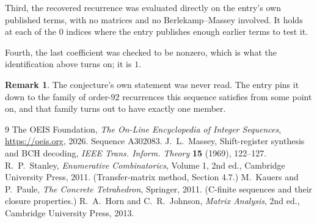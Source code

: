 \documentclass[11pt,a4paper]{article}
\theoremstyle{plain}
\theoremstyle{definition}
\newtheorem{remark}[theorem]{Remark}
\begin{document}
Third, the recovered recurrence was evaluated directly on the entry's own published terms, with
no matrices and no Berlekamp--Massey involved. It holds at each of the $0$ indices where
the entry publishes enough earlier terms to test it.

Fourth, the last coefficient was checked to be nonzero, which is what the identification above
turns on; it is $1$.

\begin{remark}
The conjecture's own statement was never read. The entry pins it down to the family of
order-$92$ recurrences this sequence satisfies from some point on, and that family turns
out to have exactly one member.
\end{remark}

\begin{thebibliography}{9}
 The OEIS Foundation, \emph{The On-Line Encyclopedia of Integer
Sequences}, \url{https://oeis.org}, 2026. Sequence A302083.
 J.~L.~Massey, Shift-register synthesis and BCH decoding, \emph{IEEE
Trans. Inform. Theory} \textbf{15} (1969), 122--127.
 R.~P.~Stanley, \emph{Enumerative Combinatorics}, Volume 1, 2nd ed.,
Cambridge University Press, 2011. (Transfer-matrix method, Section 4.7.)
 M.~Kauers and P.~Paule, \emph{The Concrete Tetrahedron}, Springer, 2011.
(C-finite sequences and their closure properties.)
 R.~A.~Horn and C.~R.~Johnson, \emph{Matrix Analysis}, 2nd ed., Cambridge
University Press, 2013.
\end{thebibliography}
\end{document}
